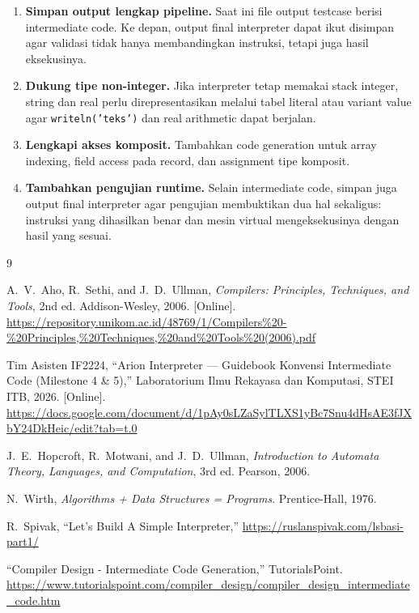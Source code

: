 \documentclass[11pt,a4paper]{article}
\begin{document}
\begin{enumerate}
    \item \textbf{Simpan output lengkap pipeline.} Saat ini file output testcase
          berisi intermediate code. Ke depan, output final interpreter dapat
          ikut disimpan agar validasi tidak hanya membandingkan instruksi, tetapi
          juga hasil eksekusinya.
    \item \textbf{Dukung tipe non-integer.} Jika interpreter tetap memakai stack
          integer, string dan real perlu direpresentasikan melalui tabel literal
          atau variant value agar \texttt{writeln('teks')} dan real arithmetic
          dapat berjalan.
    \item \textbf{Lengkapi akses komposit.} Tambahkan code generation untuk
          array indexing, field access pada record, dan assignment tipe
          komposit.
    \item \textbf{Tambahkan pengujian runtime.} Selain intermediate code,
          simpan juga output final interpreter agar pengujian membuktikan dua
          hal sekaligus: instruksi yang dihasilkan benar dan mesin virtual
          mengeksekusinya dengan hasil yang sesuai.
\end{enumerate}

\newpage
\begin{thebibliography}{9}

A.~V.~Aho, R.~Sethi, and J.~D.~Ullman,
\textit{Compilers: Principles, Techniques, and Tools}, 2nd ed.
Addison-Wesley, 2006. [Online].
\url{https://repository.unikom.ac.id/48769/1/Compilers\%20-\%20Principles,\%20Techniques,\%20and\%20Tools\%20(2006).pdf}

Tim Asisten IF2224,
``Arion Interpreter --- Guidebook Konvensi Intermediate Code (Milestone 4 \& 5),''
Laboratorium Ilmu Rekayasa dan Komputasi, STEI ITB, 2026. [Online].
\url{https://docs.google.com/document/d/1pAy0sLZaSylTLXS1yBc7Snu4dHsAE3fJXbY24DkHeic/edit?tab=t.0}

J.~E.~Hopcroft, R.~Motwani, and J.~D.~Ullman,
\textit{Introduction to Automata Theory, Languages, and Computation}, 3rd ed.
Pearson, 2006.

N.~Wirth,
\textit{Algorithms + Data Structures = Programs}.
Prentice-Hall, 1976.

R.~Spivak, ``Let's Build A Simple Interpreter,''
\url{https://ruslanspivak.com/lsbasi-part1/}

``Compiler Design - Intermediate Code Generation,''
TutorialsPoint.
\url{https://www.tutorialspoint.com/compiler_design/compiler_design_intermediate_code.htm}

\end{thebibliography}
\end{document}
